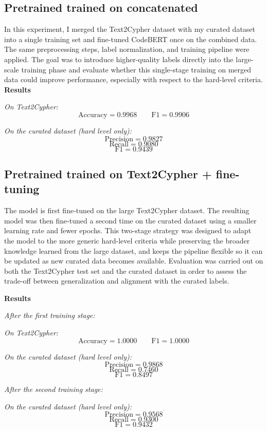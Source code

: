 \documentclass{article}
\begin{document}
\subsection{Pretrained trained on concatenated}

In this experiment, I merged the Text2Cypher dataset with my curated dataset into a single training set and fine-tuned CodeBERT once on the combined data. The same preprocessing steps, label normalization, and training pipeline were applied. The goal was to introduce higher-quality labels directly into the large-scale training phase and evaluate whether this single-stage training on merged data could improve performance, especially with respect to the hard-level criteria.
\textbf{Results}

\textit{On Text2Cypher:}
\[
\text{Accuracy} = 0.9968 \qquad \text{F1} = 0.9906
\]

\textit{On the curated dataset (hard level only):}
\[
\text{Precision} = 0.9827
\]
\[
\text{Recall} = 0.9080
\]
\[
\text{F1} = 0.9439
\]

\subsection{Pretrained trained on Text2Cypher + fine-tuning }

The model is first fine‑tuned on the large Text2Cypher dataset.
The resulting model was then fine-tuned a second time on the curated dataset using a smaller learning rate and fewer epochs. This two-stage strategy was designed to adapt the model to the more generic hard-level criteria while preserving the broader knowledge learned from the large dataset, and keeps the pipeline flexible so it can be updated as new curated data becomes available. Evaluation was carried out on both the Text2Cypher test set and the curated dataset in order to assess the trade-off between generalization and alignment with the curated labels.

\textbf{Results}

\textit{After the first training stage:}

\textit{On Text2Cypher:}
\[
\text{Accuracy} = 1.0000 \qquad \text{F1} = 1.0000
\]

\textit{On the curated dataset (hard level only):}
\[
\text{Precision} = 0.9868
\]
\[
\text{Recall} = 0.7460
\]
\[
\text{F1} = 0.8497
\]

\textit{After the second training stage:}

\textit{On the curated dataset (hard level only):}
\[
\text{Precision} = 0.9568
\]
\[
\text{Recall} = 0.9300
\]
\[
\text{F1} = 0.9432
\]
\end{document}
